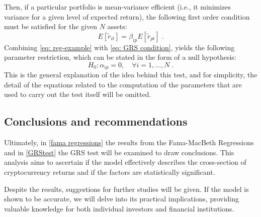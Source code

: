 Then, if a particular portfolio is mean-variance efficient (i.e., it minimizes variance for a given level of expected return), the following first order condition must be satisfied for the given $N$ assets:
\begin{equation}
	\label{eq: GRS condition}
	E[\tilde{r}_{it}] = \beta_{ip}E[\tilde{r}_{pt}]\;.
\end{equation}
Combining \eqref{eq: reg-example} with \eqref{eq: GRS condition}, yields the following parameter restriction, which can be stated in the form of a null hypothesis:
\begin{equation*}
	H_{0}: \alpha_{ip}=0,\quad \forall i=1,\dots,N\;.
\end{equation*}
This is the general explanation of the idea behind this test, and for simplicity, the detail of the equations related to the computation of the parameters that are used to carry out the test itself will be omitted.

\subsection{Conclusions and recommendations}
Ultimately, in \ref{fama regressions} the results from the Fama-MacBeth Regressions and in \ref{GRStest} the GRS test will be examined to draw conclusions. This analysis aims to ascertain if the model effectively describes the cross-section of cryptocurrency returns and if the factors are statistically significant.

Despite the results, suggestions for further studies will be given. If the model is shown to be accurate, we will delve into its practical implications, providing valuable knowledge for both individual investors and financial institutions.







